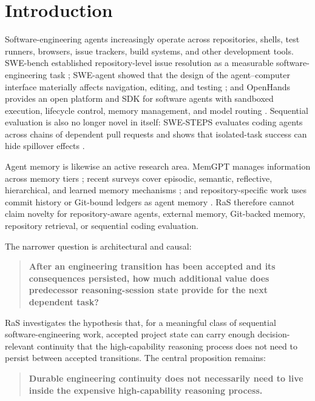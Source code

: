 \section{Introduction}
\label{sec:introduction}

Software-engineering agents increasingly operate across repositories, shells, test runners, browsers, issue trackers, build systems, and other development tools. SWE-bench established repository-level issue resolution as a measurable software-engineering task \citep{jimenez2024swebench}; SWE-agent showed that the design of the agent--computer interface materially affects navigation, editing, and testing \citep{yang2024sweagent}; and OpenHands provides an open platform and SDK for software agents with sandboxed execution, lifecycle control, memory management, and model routing \citep{wang2024openhands,wang2025openhandsSDK}. Sequential evaluation is also no longer novel in itself: SWE-STEPS evaluates coding agents across chains of dependent pull requests and shows that isolated-task success can hide spillover effects \citep{shastry2026swesteps}.

Agent memory is likewise an active research area. MemGPT manages information across memory tiers \citep{packer2023memgpt}; recent surveys cover episodic, semantic, reflective, hierarchical, and learned memory mechanisms \citep{du2026memory,luo2026memory}; and repository-specific work uses commit history or Git-bound ledgers as agent memory \citep{wang2025repomemory,li2026learningcommit,guo2026gitmemory}. RaS therefore cannot claim novelty for repository-aware agents, external memory, Git-backed memory, repository retrieval, or sequential coding evaluation.

The narrower question is architectural and causal:

\begin{quote}
\textbf{After an engineering transition has been accepted and its consequences persisted, how much additional value does predecessor reasoning-session state provide for the next dependent task?}
\end{quote}

RaS investigates the hypothesis that, for a meaningful class of sequential software-engineering work, accepted project state can carry enough decision-relevant continuity that the high-capability reasoning process does not need to persist between accepted transitions. The central proposition remains:

\begin{quote}
\textbf{Durable engineering continuity does not necessarily need to live inside the expensive high-capability reasoning process.}
\end{quote}

